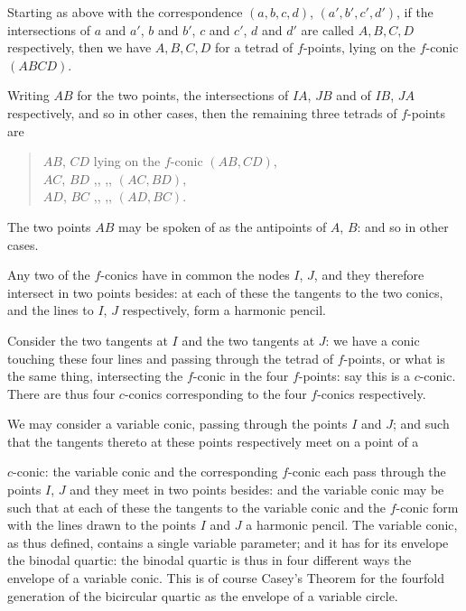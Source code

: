 \documentclass[11pt,a4paper]{article}
\begin{document}
\smallskip
Starting as above with the correspondence $(a, b, c, d)$, $(a', b', c', d')$, if the intersections of $a$ and $a'$, $b$ and $b'$, $c$ and $c'$, $d$ and $d'$ are called $A, B, C, D$ respectively, then we have $A, B, C, D$ for a tetrad of $f$-points, lying on the $f$-conic $(ABCD)$.

\smallskip
Writing $AB$ for the two points, the intersections of $IA$, $JB$ and of $IB$, $JA$ respectively, and so in other cases, then the remaining three tetrads of $f$-points are
\begin{quote}
$AB$, $CD$ lying on the $f$-conic $(AB, CD)$,\\
$AC$, $BD$ \quad ,, \quad ,, \quad $(AC, BD)$,\\
$AD$, $BC$ \quad ,, \quad ,, \quad $(AD, BC)$.
\end{quote}

The two points $AB$ may be spoken of as the antipoints of $A$, $B$: and so in other cases.

\smallskip
Any two of the $f$-conics have in common the nodes $I$, $J$, and they therefore intersect in two points besides: at each of these the tangents to the two conics, and the lines to $I$, $J$ respectively, form a harmonic pencil.

\smallskip
Consider the two tangents at $I$ and the two tangents at $J$: we have a conic touching these four lines and passing through the tetrad of $f$-points, or what is the same thing, intersecting the $f$-conic in the four $f$-points: say this is a $c$-conic. There are thus four $c$-conics corresponding to the four $f$-conics respectively.

\smallskip
We may consider a variable conic, passing through the points $I$ and $J$; and such that the tangents thereto at these points respectively meet on a point of a

\newpage

$c$-conic: the variable conic and the corresponding $f$-conic each pass through the points $I$, $J$ and they meet in two points besides: and the variable conic may be such that at each of these the tangents to the variable conic and the $f$-conic form with the lines drawn to the points $I$ and $J$ a harmonic pencil. The variable conic, as thus defined, contains a single variable parameter; and it has for its envelope the binodal quartic: the binodal quartic is thus in four different ways the envelope of a variable conic. This is of course Casey's Theorem for the fourfold generation of the bicircular quartic as the envelope of a variable circle.
\end{document}
